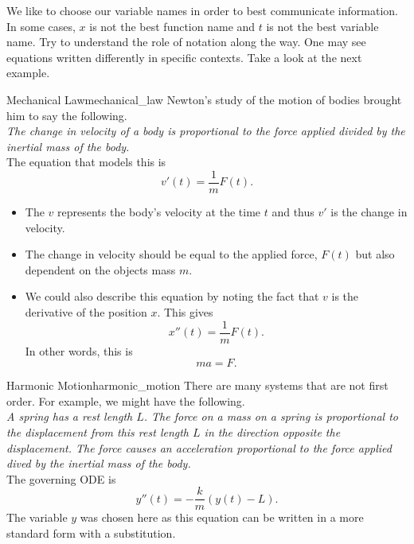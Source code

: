         We like to choose our variable names in order to best communicate information.  In some cases, $x$ is not the best function name and $t$ is not the best variable name.  Try to understand the role of notation along the way.  One may see equations written differently in specific contexts. Take a look at the next example.

        \begin{ex}{Mechanical Law}{mechanical_law}
        Newton's study of the motion of bodies brought him to say the following.\\

        \emph{The change in velocity of a body is proportional to the force applied divided by the inertial mass of the body.}\\

        The equation that models this is
        \[
        v'(t)=\frac{1}{m} F(t).
        \]
        \begin{itemize}
            \item The $v$ represents the body's velocity at the time $t$ and thus $v'$ is the change in velocity.
            \item The change in velocity should be equal to the applied force, $F(t)$ but also dependent on the objects mass $m$.
            \item We could also describe this equation by noting the fact that $v$ is the derivative of the position $x$. This gives
            \[
            x''(t)=\frac{1}{m}F(t).
            \]
            In other words, this is
            \[
            ma=F.
            \]
        \end{itemize}
        \end{ex}

        \begin{ex}{Harmonic Motion}{harmonic_motion}
        There are many systems that are not first order.  For example, we might have the following.\\

        \emph{A spring has a rest length $L$. The force on a mass on a spring is proportional to the displacement from this rest length $L$ in the direction opposite the displacement. The force causes an acceleration proportional to the force applied dived by the inertial mass of the body.}\\

        The governing ODE is
        \[
        y''(t) = -\frac{k}{m}(y(t)-L).
        \]
        The variable $y$ was chosen here as this equation can be written in a more standard form with a substitution.
        \end{ex}

